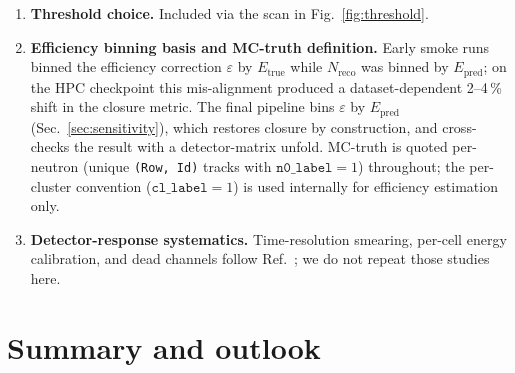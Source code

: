 \documentclass[aps,prc,twocolumn,superscriptaddress,showpacs,%
               nofootinbib,floatfix,longbibliography]{revtex4-2}
\newcommand{\Nreco}{N_{\text{reco}}}
\newcommand{\Ntrue}{N_{\text{true}}}
\newcommand{\eff}{\varepsilon}
\newcommand{\Usym}{U_{\text{sym}}}
\begin{document}
\begin{enumerate}
    Two additional training seeds ($s = 123, 456$) of
    \texttt{net\_default} were run under the same recipe as the
    2026-08-26 baseline ($s = 42$) and evaluated on the same
    full-statistics three-dataset trio.  The per-event yield ratio
    $R_d = \Ntrue(d)/\Ntrue(\texttt{defaultSpot})$ is reproducible
    to within
    $\max|R_{\text{zeroSpot}}| - \min|R_{\text{zeroSpot}}| = 0.007$
    (mean $\bar R_{\text{zeroSpot}} = 1.117$, $\sigma = 0.003$)
    and
    $\max|R_{\text{bigSpot}}| - \min|R_{\text{bigSpot}}| = 0.005$
    (mean $\bar R_{\text{bigSpot}} = 1.082$, $\sigma = 0.003$)
    across the three seeds (source:
    \texttt{results/systematics\_aggregate/seed\_variance.csv},
    aggregating cHARISMa jobs 4304929 and 4305276 on top of the
    baseline job 4300982).  Seed variance is therefore a $0.3\%$
    absolute contribution to the yield-ratio systematic budget ---
    an order of magnitude below the $k(\Usym)$ ceiling of item 2
    and negligible against the other sources in this list.
  \item \textbf{Threshold choice.}
    Included via the scan in Fig.~\ref{fig:threshold}.
  \item \label{sys:binning}\textbf{Efficiency binning basis and
        MC-truth definition.}
    Early smoke runs binned the efficiency correction $\eff$ by
    $E_{\text{true}}$ while $\Nreco$ was binned by $E_{\text{pred}}$;
    on the HPC checkpoint this mis-alignment produced a
    dataset-dependent 2–4\,\% shift in the closure metric.  The final
    pipeline bins $\eff$ by $E_{\text{pred}}$
    (Sec.~\ref{sec:sensitivity}), which restores closure by
    construction, and cross-checks the result with a detector-matrix
    unfold.  MC-truth is quoted per-neutron (unique
    \texttt{(Row, Id)} tracks with $\texttt{n0\_label}=1$) throughout;
    the per-cluster convention ($\texttt{cl\_label}=1$) is used
    internally for efficiency estimation only.
  \item \textbf{Detector-response systematics.}
    Time-resolution smearing, per-cell energy calibration, and dead
    channels follow Ref.~\cite{Morozov2024HGND}; we do not repeat
    those studies here.
\end{enumerate}

\section{Summary and outlook}
\label{sec:summary}
\end{document}

